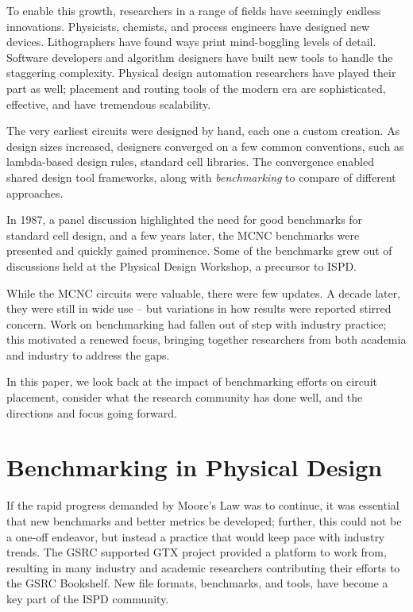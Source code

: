 \documentclass[sigconf]{acmart}
\begin{document}

To enable this growth, researchers in a range of fields have
seemingly endless innovations.  Physicists,
chemists, and process engineers have designed new devices. Lithographers
have found ways print mind-boggling levels of detail. Software developers
and algorithm designers have built new tools to handle the staggering
complexity. 
Physical design automation researchers have played their part as well;
placement and routing tools of the modern era are sophisticated, effective,
and have tremendous scalability.

The very earliest circuits were designed by hand, each one
a custom creation.  As design sizes increased, designers converged
on a few common conventions, such as lambda-based design rules, standard
cell libraries\cite{Mead93}.  The convergence enabled shared
design tool frameworks, along with {\em benchmarking}
to compare of different approaches.

In 1987, a panel discussion\cite{Preas87}
highlighted the need for good benchmarks for standard cell
design, and a few years later, the MCNC benchmarks\cite{Kozminski91}
were presented and quickly gained prominence.  Some of the benchmarks
grew out of discussions held at the Physical Design Workshop,
a precursor to ISPD.

While the MCNC circuits were valuable, there were few updates. A
decade later, they were still in wide use -- but variations in how
results were reported stirred concern\cite{Madden010030}.  Work on
benchmarking had fallen out of step with industry practice; this
motivated a renewed focus, bringing together researchers from both
academia and industry to address the gaps\cite{Adya030095,Adya040472}.

In this paper, we look back at the impact of benchmarking
efforts on circuit placement, consider what the research
community has done well, and the directions and focus
going forward.


\section{Benchmarking in Physical Design}

If the rapid progress demanded by Moore's Law was to continue, it
was essential that new benchmarks and better metrics be developed;
further, this could not be a one-off endeavor, but instead a
practice that would keep pace with industry trends.  The
GSRC supported GTX project
\cite{Caldwell000693} provided a platform to work from,
resulting in many industry and academic researchers
contributing their efforts to the GSRC Bookshelf\cite{umichbookshelf}.
New file formats, benchmarks, and tools, have become
a key part of the ISPD community.
\end{document}
